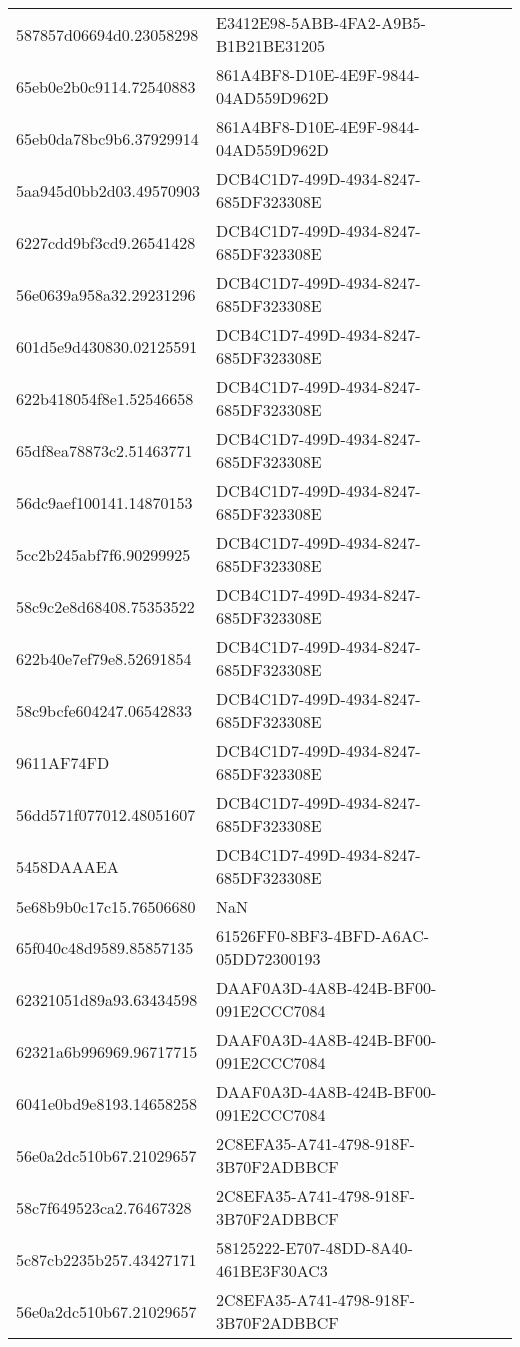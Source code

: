 \begin{tabular}{ll}
587857d06694d0.23058298 & E3412E98-5ABB-4FA2-A9B5-B1B21BE31205 \\
65eb0e2b0c9114.72540883 & 861A4BF8-D10E-4E9F-9844-04AD559D962D \\
65eb0da78bc9b6.37929914 & 861A4BF8-D10E-4E9F-9844-04AD559D962D \\
5aa945d0bb2d03.49570903 & DCB4C1D7-499D-4934-8247-685DF323308E \\
6227cdd9bf3cd9.26541428 & DCB4C1D7-499D-4934-8247-685DF323308E \\
56e0639a958a32.29231296 & DCB4C1D7-499D-4934-8247-685DF323308E \\
601d5e9d430830.02125591 & DCB4C1D7-499D-4934-8247-685DF323308E \\
622b418054f8e1.52546658 & DCB4C1D7-499D-4934-8247-685DF323308E \\
65df8ea78873c2.51463771 & DCB4C1D7-499D-4934-8247-685DF323308E \\
56dc9aef100141.14870153 & DCB4C1D7-499D-4934-8247-685DF323308E \\
5cc2b245abf7f6.90299925 & DCB4C1D7-499D-4934-8247-685DF323308E \\
58c9c2e8d68408.75353522 & DCB4C1D7-499D-4934-8247-685DF323308E \\
622b40e7ef79e8.52691854 & DCB4C1D7-499D-4934-8247-685DF323308E \\
58c9bcfe604247.06542833 & DCB4C1D7-499D-4934-8247-685DF323308E \\
9611AF74FD & DCB4C1D7-499D-4934-8247-685DF323308E \\
56dd571f077012.48051607 & DCB4C1D7-499D-4934-8247-685DF323308E \\
5458DAAAEA & DCB4C1D7-499D-4934-8247-685DF323308E \\
5e68b9b0c17c15.76506680 & NaN \\
65f040c48d9589.85857135 & 61526FF0-8BF3-4BFD-A6AC-05DD72300193 \\
62321051d89a93.63434598 & DAAF0A3D-4A8B-424B-BF00-091E2CCC7084 \\
62321a6b996969.96717715 & DAAF0A3D-4A8B-424B-BF00-091E2CCC7084 \\
6041e0bd9e8193.14658258 & DAAF0A3D-4A8B-424B-BF00-091E2CCC7084 \\
56e0a2dc510b67.21029657 & 2C8EFA35-A741-4798-918F-3B70F2ADBBCF \\
58c7f649523ca2.76467328 & 2C8EFA35-A741-4798-918F-3B70F2ADBBCF \\
5c87cb2235b257.43427171 & 58125222-E707-48DD-8A40-461BE3F30AC3 \\
56e0a2dc510b67.21029657 & 2C8EFA35-A741-4798-918F-3B70F2ADBBCF \\

\end{tabular}
